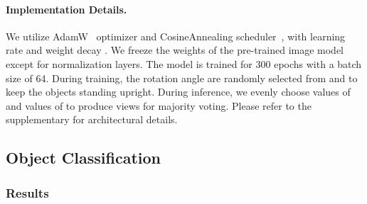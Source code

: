 \documentclass{article}
\begin{document}
\paragraph{Implementation Details.} We utilize AdamW~\cite{loshchilov2017adamw} optimizer and CosineAnnealing scheduler~\cite{loshchilov2016sgdr}, with learning rate  and weight decay . We freeze the weights of the pre-trained image model except for normalization layers. The model is trained for 300 epochs with a batch size of 64. During training, the rotation angle  are randomly selected from  and  to keep the objects standing upright. During inference, we evenly choose  values of  and  values of  to produce  views for majority voting. Please refer to the supplementary for architectural details.


\subsection{Object Classification}

\subsubsection{Results}
\label{sec:exp_cls}
\end{document}
